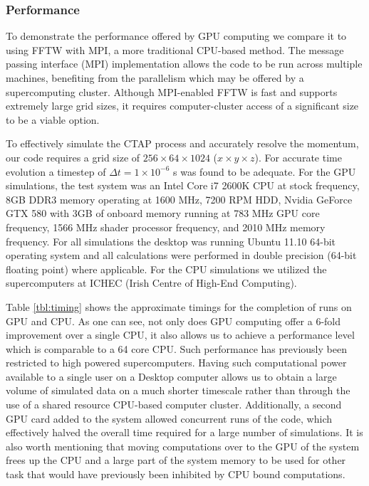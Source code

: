 \subsubsection{Performance}
To demonstrate the performance offered by GPU computing we compare it to using FFTW with MPI, a more traditional CPU-based method. The message passing interface (MPI) implementation allows the code to be run across multiple machines, benefiting from the parallelism which may be offered by a supercomputing cluster. Although MPI-enabled FFTW is fast and supports extremely large grid sizes, it requires computer-cluster access of a significant size to be a viable option.

To effectively simulate the CTAP process and accurately resolve the momentum, our code requires a grid size of $256\times 64\times1024$ ($x\times y\times z$). For accurate time evolution a timestep of $\Delta t = 1\times 10^{-6}$ s was found to be adequate. For the GPU simulations, the test system was an Intel Core i7 2600K CPU at stock frequency, 8GB DDR3 memory operating at 1600 MHz, 7200 RPM HDD, Nvidia GeForce GTX 580 with 3GB of onboard memory running at 783 MHz GPU core frequency, 1566 MHz shader processor frequency, and 2010 MHz memory frequency. For all simulations the desktop was running Ubuntu 11.10 64-bit operating system and all calculations were performed in double precision (64-bit floating point) where applicable. For the CPU simulations we utilized the supercomputers at ICHEC (Irish Centre of High-End Computing).

Table \ref{tbl:timing} shows the approximate timings for the completion of runs on GPU and CPU. As one can see, not only does GPU computing offer a 6-fold improvement over a single CPU, it also allows us to achieve a performance level which is comparable to a 64 core CPU. Such performance has previously been restricted to high powered supercomputers. Having such computational power available to a single user on a Desktop computer allows us to obtain a large volume of simulated data on a much shorter timescale rather than through the use of a shared resource CPU-based computer cluster. Additionally, a second GPU card added to the system allowed concurrent runs of the code, which effectively halved the overall time required for a large number of simulations. It is also worth mentioning that moving computations over to the GPU of the system frees up the CPU and a large part of the system memory to be used for other task that would have previously been inhibited by CPU bound computations.

